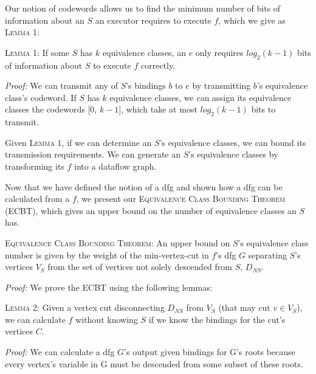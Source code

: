 Our notion of codewords allows us to find the minimum number of bits of information about an $S$ an executor requires to execute $f$, which we give as \textsc{Lemma 1}:
\vspace{1mm}

\noindent \textsc{Lemma 1:} If some $S$ has $k$ equivalence classes, an $e$ only requires $log_2(k-1)$ bits of information about $S$ to execute $f$ correctly.\vspace{1mm} 

\noindent \textit{Proof:} We can transmit any of $S$'s bindings $b$ to $e$ by transmitting $b$'s equivalence class's codeword. If $S$ has $k$ equivalence classes, we can assign its equivalence classes the codewords [$0$, $k-1$], which take at most $log_2(k-1)$ bits to transmit.
\vspace{1mm}

 Given \textsc{Lemma 1}, if we can determine an $S$'s equivalence classes, we can bound its transmission requirements. We can generate an $S$'s equivalence classes by transforming its $f$ into a dataflow graph.

\vspace{1mm}
\noindent {}

 Now that we have defined the notion of a dfg and shown how a dfg can be calculated from a $f$, we present our \textsc{Equivalence Class Bounding Theorem} (ECBT), which gives an upper bound on the number of equivalence classes an $S$ has.
\vspace{1mm}

\noindent \textsc{Equivalence Class Bounding Theorem:} An upper bound on $S$'s equivalence class number is given by the weight of the min-vertex-cut in $f$'s dfg $G$ separating $S$'s vertices $V_S$ from the set of vertices not solely descended from $S$, $D_{NS}$.
\vspace{1mm}

\noindent \textit{Proof:} We prove the ECBT using the following lemmas:
\vspace{1mm}

\noindent \textsc{Lemma 2:} Given a vertex cut disconnecting $D_{NS}$ from $V_S$ (that may cut $v \in V_S$), we can calculate $f$ without knowing $S$ if we know the bindings for the cut's vertices $C$.
\vspace{1mm}

\noindent \textit{Proof:}  We can calculate a dfg $G$'s output given bindings for G's roots because every vertex's variable in G must be descended from some subset of these roots. 

